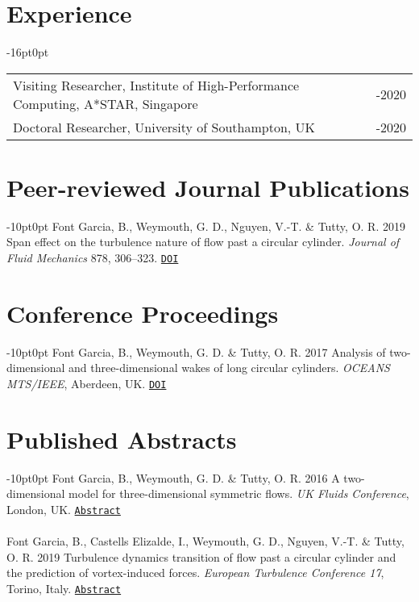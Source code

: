 \documentclass[line]{res}
\newenvironment{p}
  {\begin{adjustwidth}{-10pt}{0pt}}
  {\end{adjustwidth}}
\newenvironment{p1}
  {\begin{adjustwidth}{-16pt}{0pt}
  \vspace{1pt}}
  {\end{adjustwidth}}
\begin{document}
\begin{resume}
\section{Experience}
\begin{p1}
\begin{tabular}{p{} >{\raggedleft\arraybackslash}p{}}
Visiting Researcher, Institute of High-Performance Computing, A*STAR, Singapore & 2017-2020\\
Doctoral Researcher, University of Southampton, UK & 2015-2020
\end{tabular}
\end{p1}
 
\section{Peer-reviewed Journal Publications}
\begin{p}
Font Garcia, B., Weymouth, G. D., Nguyen, V.-T. \& Tutty, O. R. 2019 Span effect on the turbulence nature of flow past a circular cylinder. \textit{Journal of Fluid Mechanics} 878, 306--323. \href{https://doi.org/10.1017/jfm.2019.637}{\texttt{DOI}}
\end{p}

\section{Conference Proceedings}
\begin{p}
Font Garcia, B., Weymouth, G. D.  \&  Tutty, O. R. 2017 Analysis of two-dimensional and three-dimensional wakes of long circular cylinders. {\em OCEANS MTS/IEEE}, Aberdeen, 	UK. \href{https://doi.org/10.1109/OCEANSE.2017.8084904}{\texttt{DOI}}
\end{p}

\section{Published Abstracts}
\begin{p}
Font Garcia, B., Weymouth, G. D.  \&  Tutty, O. R. 2016  A two-dimensional model for three-dimensional symmetric flows. \textit{UK Fluids Conference}, London, UK.  \href{https://www.imperial.ac.uk/media/imperial-college/faculty-of-engineering/aeronautics/UK-Fluids-Conference-2016-booklet.pdf}{\texttt{Abstract}}\\
\\
Font Garcia, B., Castells Elizalde, I., Weymouth, G. D., Nguyen, V.-T.  \&  Tutty, O. R. 2019  Turbulence dynamics transition of flow past a circular cylinder and the prediction of vortex-induced forces. \textit{European Turbulence Conference 17}, Torino, Italy.  \href{https://etc17.fyper.com/program/show_slot/41}{\texttt{Abstract}}
\end{p}


\end{resume}
\end{document}
